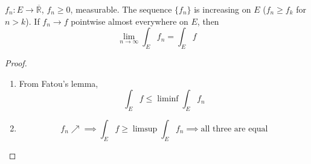 \begin{theorem}
    $f_n : E \to \overline{\mathbb{R}}$, $f_n \ge 0$, measurable.
    The sequence $\{f_n\}$ is increasing on $E$
    ($f_n \ge f_k$ for $n > k$).
    If $f_n \to f$ pointwise almost everywhere on $E$, then 
    \[ \lim_{n \to \infty} \int_E f_n = \int_E f \]
\end{theorem}
\begin{proof}
    \mbox{}
    \begin{enumerate}
        \item {
            From Fatou's lemma,
            \[ \int_E f \le \liminf \int_E f_n \]
        }
        \item {
            \[ f_n \nearrow \implies \int_E f \ge \limsup \int_E f_n \implies
            \text{all three are equal} \]
        }
    \end{enumerate}
\end{proof}

